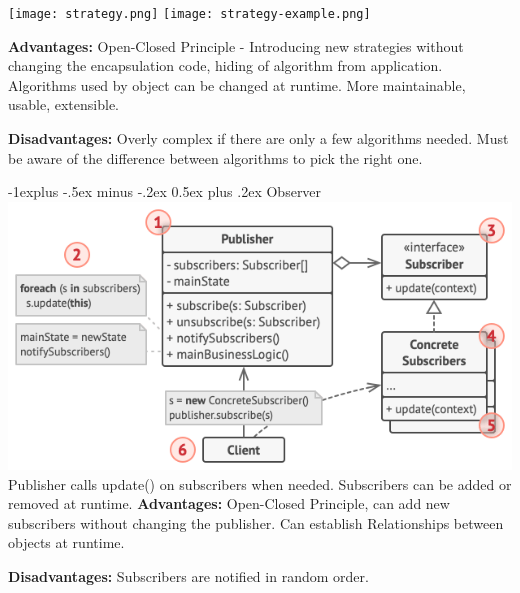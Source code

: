 \documentclass[letterpaper, 8pt]{extarticle}
\makeatletter
\renewcommand{\subsection}{\@startsection{subsection}{2}{0mm}%
                                {-1explus -.5ex minus -.2ex}%
                                {0.5ex plus .2ex}%
                                {\normalfont\small\bfseries}}
\makeatother
\begin{document}
\begin{multicols*}{6}
\begin{enumerate}
\begin{lstlisting}[language=Java, breaklines=true]
        \end{lstlisting}
  \end{enumerate}
  \begin{center}
    \texttt{[image: strategy.png]}
    \texttt{[image: strategy-example.png]}
  \end{center}

  \textbf{Advantages:}
  Open-Closed Principle - Introducing new strategies without changing the encapsulation code,
  hiding of algorithm from application.
  Algorithms used by object can be changed at runtime.
  More maintainable, usable, extensible.

  \textbf{Disadvantages:}
  Overly complex if there are only a few algorithms needed.
  Must be aware of the difference between algorithms to pick the right one.

  \subsection{Observer}
  \includegraphics[width=\linewidth]{observer-example.png}
  Publisher calls update() on subscribers when needed. Subscribers can be added or removed at runtime.
  \textbf{Advantages:} Open-Closed Principle, can add new subscribers without changing the publisher.
  Can establish Relationships between objects at runtime.

  \textbf{Disadvantages:} Subscribers are notified in random order.


\end{multicols*}
\end{document}
